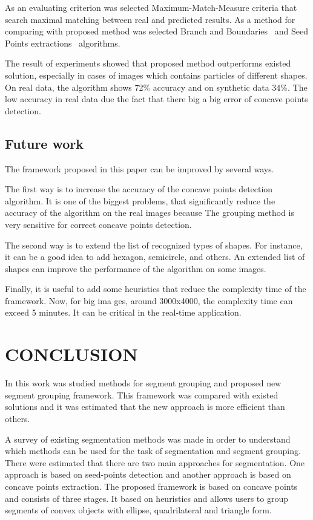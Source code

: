 \documentclass{lutmscthesis}[2010/09/22]
\begin{document}
As an evaluating criterion was selected Maximum-Match-Measure criteria that search maximal matching between real and predicted results. As a method for comparing with proposed method was selected Branch and Boundaries~\cite{zafari-bb} and Seed Points extractions~\cite{Zafari15} algorithms.

The result of experiments showed that proposed method outperforms existed solution, especially in cases of images which contains particles of different shapes. On real data, the algorithm shows 72\% accuracy and on synthetic data 34\%. The low accuracy in real data due the fact that there big a big error of concave points detection. 

\subsection{Future work}

The framework proposed in this paper can be improved by several ways.

The first way is to increase the accuracy of the concave points detection algorithm. It is one of the biggest problems, that significantly reduce the accuracy of the algorithm on the real images because The grouping method is very sensitive for correct concave points detection.

The second way is to extend the list of recognized types of shapes. For instance, it can be a good idea to add hexagon, semicircle, and others. An extended list of shapes can improve the performance of the algorithm on some images.

Finally, it is useful to add some heuristics that reduce the complexity time of the framework. Now, for big ima  ges, around 3000x4000, the complexity time can exceed 5 minutes. It can be critical in the real-time application.

\section{CONCLUSION}
\label{sec:conclusion}

In this work was studied methods for segment grouping and proposed new segment grouping framework. This framework was compared with existed solutions and it was estimated that the new approach is more efficient than others.

A survey of existing segmentation methods was made in order to understand which methods can be used for the task of segmentation and segment grouping. There were estimated that there are two main approaches for segmentation. One approach is based on seed-points detection and another approach is based on concave points extraction. The proposed framework is based on concave points and consists of three stages. It based on heuristics and allows users to group segments of convex objects with ellipse, quadrilateral and triangle form. 
\end{document}
